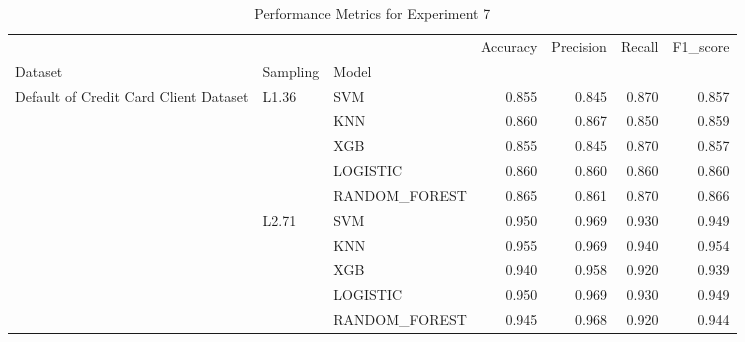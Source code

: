 \begin{table}
\caption{Performance Metrics for Experiment 7}
\label{tab:experiment_7_results}
\begin{tabular}{lllrrrr}
\toprule
 &  &  & Accuracy & Precision & Recall & F1\_score \\
Dataset & Sampling & Model &  &  &  &  \\
\midrule
\multirow[t]{10}{*}{Default of Credit Card Client Dataset} & \multirow[t]{5}{*}{L1.36} & SVM & 0.855 & 0.845 & 0.870 & 0.857 \\
 &  & KNN & 0.860 & 0.867 & 0.850 & 0.859 \\
 &  & XGB & 0.855 & 0.845 & 0.870 & 0.857 \\
 &  & LOGISTIC & 0.860 & 0.860 & 0.860 & 0.860 \\
 &  & RANDOM\_FOREST & 0.865 & 0.861 & 0.870 & 0.866 \\
\cline{2-7}
 & \multirow[t]{5}{*}{L2.71} & SVM & 0.950 & 0.969 & 0.930 & 0.949 \\
 &  & KNN & 0.955 & 0.969 & 0.940 & 0.954 \\
 &  & XGB & 0.940 & 0.958 & 0.920 & 0.939 \\
 &  & LOGISTIC & 0.950 & 0.969 & 0.930 & 0.949 \\
 &  & RANDOM\_FOREST & 0.945 & 0.968 & 0.920 & 0.944 \\
\cline{1-7} \cline{2-7}
\bottomrule
\end{tabular}
\end{table}
